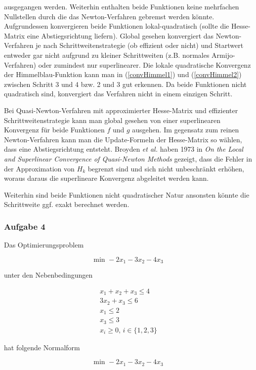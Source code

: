 \documentclass[a4paper, 12pt]{report}
\begin{document}
ausgegangen werden. Weiterhin enthalten beide Funktionen keine mehrfachen Nullstellen durch die das Newton-Verfahren
gebremst werden könnte. Aufgrundessen konvergieren beide Funktionen lokal-quadratisch (sollte die Hesse-Matrix eine
Abstiegsrichtung liefern). Global gesehen konvergiert das Newton-Verfahren je nach Schrittweitenstrategie
(ob effizient oder nicht) und Startwert entweder gar nicht aufgrund zu kleiner Schrittweiten (z.B. normales Armijo-Verfahren)
oder zumindest nur superlinearer. Die lokale quadratische Konvergenz der Himmelblau-Funktion kann man in (\ref{convHimmel1})
und (\ref{convHimmel2}) zwischen Schritt 3 und 4 bzw. 2 und 3 gut erkennen. Da beide Funktionen nicht quadratisch sind,
konvergiert das Verfahren nicht in einem einzigen Schritt.\par
Bei Quasi-Newton-Verfahren mit approximierter Hesse-Matrix und effizienter Schrittweitenstrategie kann man global gesehen
von einer superlinearen Konvergenz für beide Funktionen $f$ und $g$ ausgehen. Im gegensatz zum reinen Newton-Verfahren kann man 
die Update-Formeln der Hesse-Matrix so wählen, dass eine Abstiegsrichtung entsteht. Broyden \textit{et al.} haben 1973
in \textit{On the Local and Superlinear Convergence of Quasi-Newton Methods} gezeigt, dass die Fehler in der Approximation
von $H_k$ begrenzt sind und sich nicht unbeschränkt erhöhen, woraus daraus die superlineare Konvergenz
abgeleitet werden kann.\par
Weiterhin sind beide Funktionen nicht quadratischer Natur ansonsten könnte die Schrittweite ggf. exakt berechnet werden.

\subsubsection{Aufgabe 4}

Das Optimierungsproblem

$$ \text{min } -2x_1 - 3x_2 - 4x_3$$

unter den Nebenbedingungen

\begin{align*} 
  x_1 + x_2 + x_3 \leq 4\\
  3x_2 + x_3 \leq 6\\
  x_1 \leq 2\\
  x_3 \leq 3\\
  x_i \geq 0 \text{, } i \in \{1, 2, 3\}
\end{align*}

hat folgende Normalform

$$ \text{min } -2x_1 - 3x_2 - 4x_3$$
\end{document}
